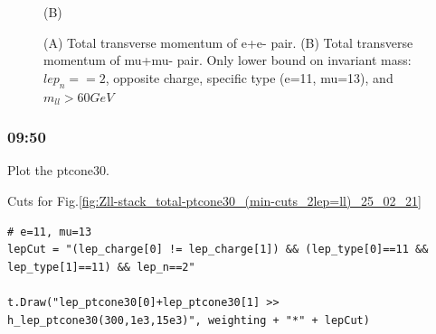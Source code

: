 \begin{figure}[h!]
\begin{minipage}{0.5\textwidth}
        (B)
    \end{minipage}
    \caption{(A) Total transverse momentum of e+e- pair. (B) Total transverse momentum of mu+mu- pair. Only lower bound on invariant mass: $lep_n==2$, opposite charge, specific type (e=11, mu=13), and $m_{ll} > 60 GeV$ }
    \label{fig:Zll-Stack_total-pt_(inv-mass-lower=60GeV_2lep=ll)_25-02-21}
\end{figure}

\subsubsection*{09:50}
Plot the ptcone30.

Cuts for Fig.\ref{fig:Zll-stack_total-ptcone30_(min-cuts_2lep=ll)_25_02_21}
\begin{lstlisting}
# e=11, mu=13
lepCut = "(lep_charge[0] != lep_charge[1]) && (lep_type[0]==11 && lep_type[1]==11) && lep_n==2"

t.Draw("lep_ptcone30[0]+lep_ptcone30[1] >> h_lep_ptcone30(300,1e3,15e3)", weighting + "*" + lepCut)
\end{lstlisting}
